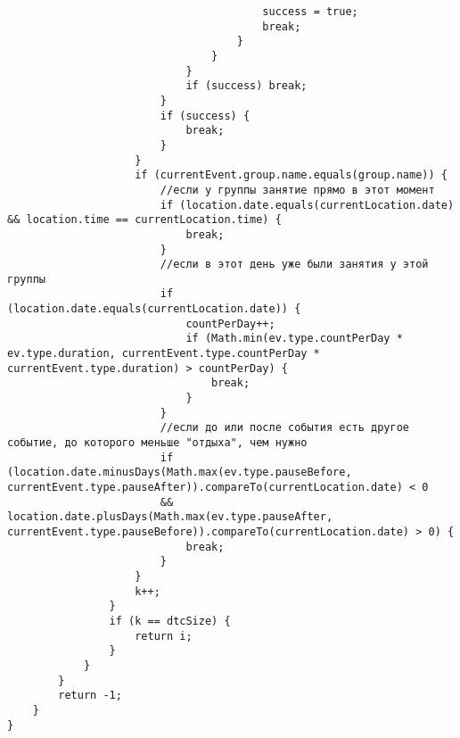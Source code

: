 \begin{lstlisting}
										success = true;
										break;
									}
								}
							}
							if (success) break;
						}
						if (success) {
							break;
						}
					}
					if (currentEvent.group.name.equals(group.name)) {
						//если у группы занятие прямо в этот момент
						if (location.date.equals(currentLocation.date) && location.time == currentLocation.time) {
							break;
						}
						//если в этот день уже были занятия у этой группы
						if (location.date.equals(currentLocation.date)) {
							countPerDay++;
							if (Math.min(ev.type.countPerDay * ev.type.duration, currentEvent.type.countPerDay * currentEvent.type.duration) > countPerDay) {
								break;
							}
						}
						//если до или после события есть другое событие, до которого меньше "отдыха", чем нужно
						if (location.date.minusDays(Math.max(ev.type.pauseBefore, currentEvent.type.pauseAfter)).compareTo(currentLocation.date) < 0
						&& location.date.plusDays(Math.max(ev.type.pauseAfter, currentEvent.type.pauseBefore)).compareTo(currentLocation.date) > 0) {
							break;
						}
					}
					k++;
				}
				if (k == dtcSize) {
					return i;
				}
			}
		}
		return -1;
	}
}
\end{lstlisting}
